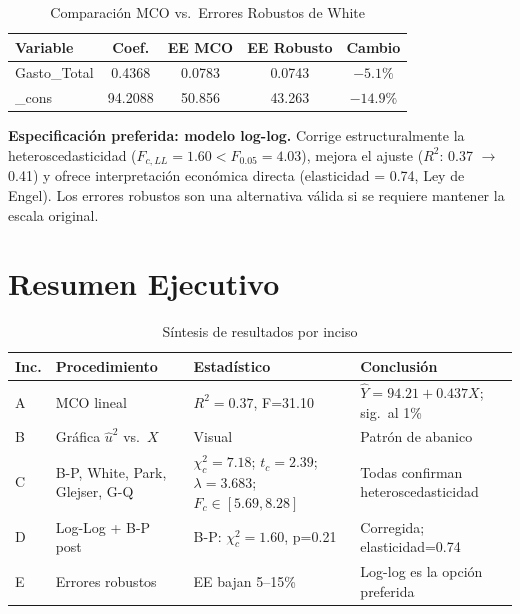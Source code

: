 \documentclass[12pt,a4paper]{article}
\begin{document}
\begin{table}[H]
\centering
\caption{Comparación MCO vs.\ Errores Robustos de White}
\begin{tabular}{lcccc}
\toprule
\textbf{Variable} & \textbf{Coef.} & \textbf{EE MCO} & \textbf{EE Robusto} & \textbf{Cambio}\\
\midrule
Gasto\_Total & 0.4368 & 0.0783 & 0.0743 & $-5.1\%$\\
\_cons       & 94.2088 & 50.856 & 43.263 & $-14.9\%$\\
\bottomrule
\end{tabular}
\end{table}

\begin{cajaconclucion}[title=Decisión Final]
\textbf{Especificación preferida: modelo log-log.}
Corrige estructuralmente la heteroscedasticidad ($F_{c,LL}=1.60 < F_{0.05}=4.03$),
mejora el ajuste ($R^2$: 0.37 $\to$ 0.41) y ofrece interpretación económica directa
(elasticidad = 0.74, Ley de Engel).
Los errores robustos son una alternativa válida si se requiere mantener la escala original.
\end{cajaconclucion}

\section{Resumen Ejecutivo}

\begin{table}[H]
\centering
\caption{Síntesis de resultados por inciso}
\begin{tabular}{p{0.8cm}p{4.5cm}p{3.2cm}p{4.5cm}}
\toprule
\textbf{Inc.} & \textbf{Procedimiento} & \textbf{Estadístico} & \textbf{Conclusión}\\
\midrule
A & MCO lineal & $R^2=0.37$, F=31.10 & $\hat{Y}=94.21+0.437X$; sig.\ al 1\%\\
\addlinespace
B & Gráfica $\hat{u}^2$ vs.\ $X$ & Visual & Patrón de abanico\\
\addlinespace
C & B-P, White, Park, Glejser, G-Q &
  $\chi^2_c=7.18$; $t_c=2.39$; $\lambda=3.683$; $F_c\in[5.69,8.28]$ &
  Todas confirman heteroscedasticidad\\
\addlinespace
D & Log-Log + B-P post & B-P: $\chi^2_c=1.60$, p=0.21 & Corregida; elasticidad=0.74\\
\addlinespace
E & Errores robustos & EE bajan 5--15\% & Log-log es la opción preferida\\
\bottomrule
\end{tabular}
\end{table}
\end{document}
